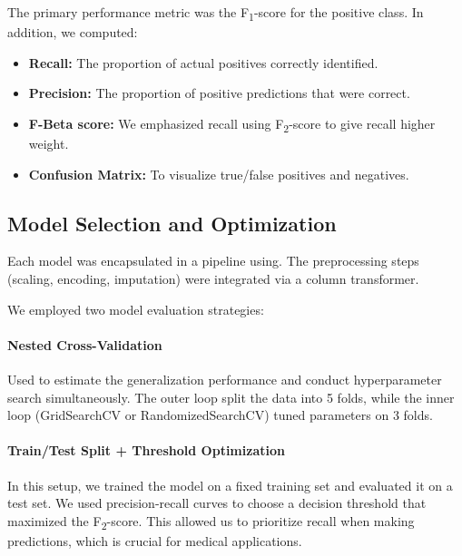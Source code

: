 \documentclass{article}
\begin{document}
The primary performance metric was the F\textsubscript{1}-score for the positive class. In addition, we computed:

\begin{itemize}

\item \textbf{Recall:} The proportion of actual positives correctly identified.

\item \textbf{Precision:} The proportion of positive predictions that were correct.

\item \textbf{F-Beta score:} We emphasized recall using F\textsubscript{2}-score to give recall higher weight.

\item \textbf{Confusion Matrix:} To visualize true/false positives and negatives.

\end{itemize}



\subsection{Model Selection and Optimization}

Each model was encapsulated in a pipeline using. The preprocessing steps (scaling, encoding, imputation) were integrated via a column transformer.


We employed two model evaluation strategies:

\paragraph{Nested Cross-Validation} Used to estimate the generalization performance and conduct hyperparameter search simultaneously. The outer loop split the data into 5 folds, while the inner loop (GridSearchCV or RandomizedSearchCV) tuned parameters on 3 folds.



\paragraph{Train/Test Split + Threshold Optimization} In this setup, we trained the model on a fixed training set and evaluated it on a test set. We used precision-recall curves to choose a decision threshold that maximized the F\textsubscript{2}-score. This allowed us to prioritize recall when making predictions, which is crucial for medical applications.
\end{document}

